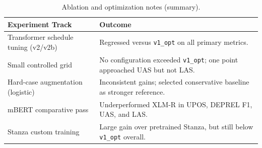 \begin{table}[H]
\centering
\caption{Ablation and optimization notes (summary).}
\label{tab:ablation_notes}
\begin{tabular}{p{3.2cm}p{8.8cm}}
\toprule
Experiment Track & Outcome \\
\midrule
Transformer schedule tuning (v2/v2b) & Regressed versus \texttt{v1\_opt} on all primary metrics. \\
Small controlled grid & No configuration exceeded \texttt{v1\_opt}; one point approached UAS but not LAS. \\
Hard-case augmentation (logistic) & Inconsistent gains; selected conservative baseline as stronger reference. \\
mBERT comparative pass & Underperformed XLM-R in UPOS, DEPREL F1, UAS, and LAS. \\
Stanza custom training & Large gain over pretrained Stanza, but still below \texttt{v1\_opt} overall. \\
\bottomrule
\end{tabular}
\end{table}
